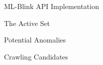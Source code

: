 \begin{frame}{ML-Blink API Implementation}
\end{frame}

\begin{frame}{The Active Set}
\end{frame}

\begin{frame}{Potential Anomalies}
\end{frame}

\begin{frame}{Crawling Candidates}
\end{frame}